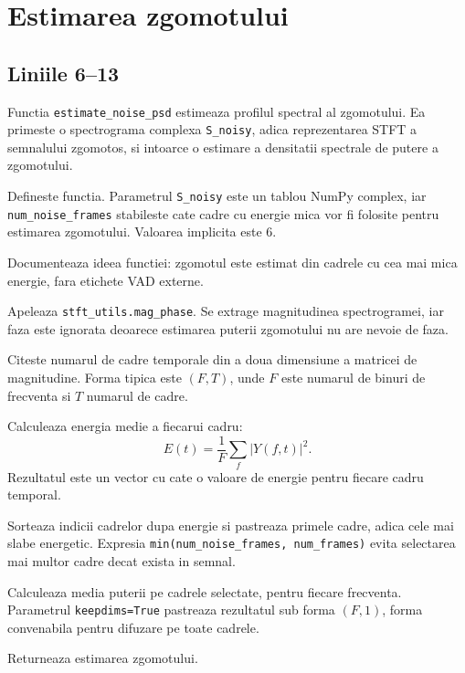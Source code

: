 \documentclass[12pt,a4paper]{report}
\newcommand{\codechunk}[2]{
    
}
\begin{document}
\chapter{Estimarea zgomotului}

\section{Liniile 6--13}

\codechunk{6}{13}

Functia \texttt{estimate\_noise\_psd} estimeaza profilul spectral al zgomotului. Ea primeste o spectrograma complexa \texttt{S\_noisy}, adica reprezentarea STFT a semnalului zgomotos, si intoarce o estimare a densitatii spectrale de putere a zgomotului.

\begin{description}[leftmargin=2.8cm,style=nextline]
    \item[Linia 6] Defineste functia. Parametrul \texttt{S\_noisy} este un tablou NumPy complex, iar \texttt{num\_noise\_frames} stabileste cate cadre cu energie mica vor fi folosite pentru estimarea zgomotului. Valoarea implicita este 6.
    \item[Linia 7] Documenteaza ideea functiei: zgomotul este estimat din cadrele cu cea mai mica energie, fara etichete VAD externe.
    \item[Linia 8] Apeleaza \texttt{stft\_utils.mag\_phase}. Se extrage magnitudinea spectrogramei, iar faza este ignorata deoarece estimarea puterii zgomotului nu are nevoie de faza.
    \item[Linia 9] Citeste numarul de cadre temporale din a doua dimensiune a matricei de magnitudine. Forma tipica este \((F,T)\), unde \(F\) este numarul de binuri de frecventa si \(T\) numarul de cadre.
    \item[Linia 10] Calculeaza energia medie a fiecarui cadru:
    \[
    E(t) = \frac{1}{F}\sum_f |Y(f,t)|^2.
    \]
    Rezultatul este un vector cu cate o valoare de energie pentru fiecare cadru temporal.
    \item[Linia 11] Sorteaza indicii cadrelor dupa energie si pastreaza primele cadre, adica cele mai slabe energetic. Expresia \texttt{min(num\_noise\_frames, num\_frames)} evita selectarea mai multor cadre decat exista in semnal.
    \item[Linia 12] Calculeaza media puterii pe cadrele selectate, pentru fiecare frecventa. Parametrul \texttt{keepdims=True} pastreaza rezultatul sub forma \((F,1)\), forma convenabila pentru difuzare pe toate cadrele.
    \item[Linia 13] Returneaza estimarea zgomotului.
\end{description}
\end{document}
